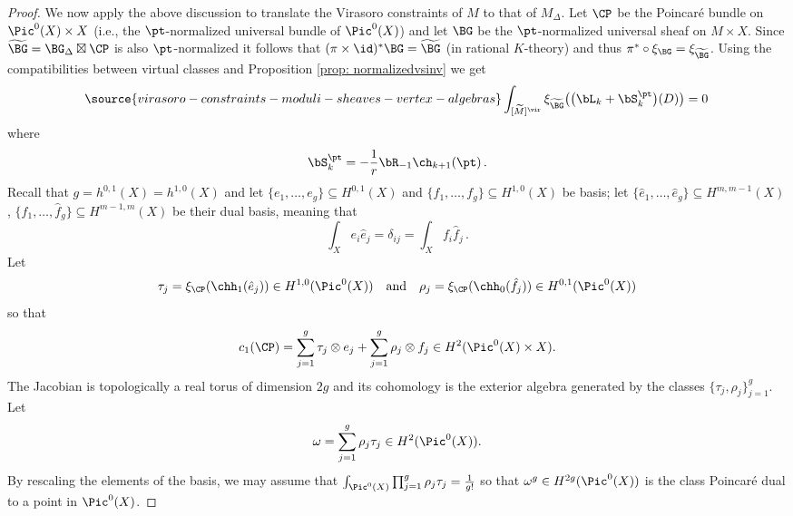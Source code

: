 \begin{proof}
We now apply the above discussion to translate the Virasoro constraints of $M$ to that of $M_\Delta$. Let $\CP$ be the Poincaré bundle on $\Pic^0(X)\times X$ (i.e., the $\pt$-normalized universal bundle of $\Pic^0(X)$) and let $\BG$ be the $\pt$-normalized universal sheaf on $M\times X$. Since $\widetilde{\BG}=\BG_\Delta\boxtimes \CP$ is also $\pt$-normalized it follows that $(\pi\times \id)^\ast \BG=\widetilde \BG$ (in rational $K$-theory) and thus $\pi^\ast\circ \xi_{\BG}=\xi_{\widetilde \BG}$. Using the compatibilities between virtual classes and Proposition \ref{prop: normalizedvsinv} we get
\begin{equation}\label{eq: virasoromtilde}
\source{virasoro-constraints-moduli-sheaves-vertex-algebras}
\int_{[\widetilde M]^\vir}\xi_{\widetilde \BG}\big(\big(\bL_k+\bS_k^\pt\big)(D)\big)=0\,
\end{equation}
where $$\bS_k^\pt=-\frac{1}{r}\bR_{-1}\ch_{k+1}(\pt)\,.$$
Recall that $g=h^{0,1}(X)=h^{1,0}(X)$ and let $\{e_1, \ldots, e_g\}\subseteq H^{0,1}(X)$ and $\{f_1, \ldots, f_g\}\subseteq H^{1,0}(X)$ be basis; let $\{\hat e_1, \ldots, \hat e_g\}\subseteq H^{m, m-1}(X)$, $\{\hat f_1, \ldots, \hat f_g\}\subseteq H^{m-1, m}(X)$ be their dual basis, meaning that
\[\int_X e_i \hat e_j=\delta_{ij}=\int_X f_i \hat f_j\,.\]
Let
\[\tau_j=\xi_{\CP}(\chh_1(\hat e_j))\in H^{1,0}(\Pic^0(X))\quad \textup{and}\quad \rho_j=\xi_{\CP}(\chh_0(\hat f_j))\in H^{0,1}(\Pic^0(X))\]
so that
\[c_1(\CP)=\sum_{j=1}^g \tau_j\otimes e_j+\sum_{j=1}^g \rho_j\otimes f_j\in H^2(\Pic^0(X)\times X).\]
The Jacobian is topologically a real torus of dimension $2g$ and its cohomology is the exterior algebra generated by the classes $\{\tau_j, \rho_j\}_{j=1}^g$.
Let
\[\omega=\sum_{j=1}^g \rho_j\tau_j\in H^2(\Pic^0(X)).\]
By rescaling the elements of the basis, we may assume that $\int_{\Pic^0(X)}\prod_{j=1}^g \rho_j\tau_j=\frac{1}{g!}$ so that $\omega^g\in H^{2g}(\Pic^0(X))$ is the class Poincaré dual to a point in $\Pic^0(X)$.


\end{proof}
